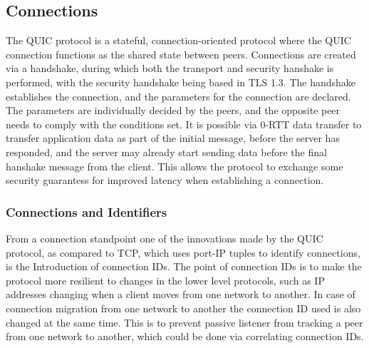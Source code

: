 \documentclass[english, 12pt, a4paper, elec, utf8, a-2b, online]{aaltothesis}
\begin{document}
\subsection{Connections}

The QUIC protocol is a stateful, connection-oriented protocol where the QUIC
connection functions as the shared state between peers. Connections are created
via a handshake, during which both the transport and security hanshake is performed,
with the security handshake being based in TLS 1.3\cite{rfc9001}. The handshake establishes
the connection, and the parameters for the connection are declared. The parameters
are individually decided by the peers, and the opposite peer needs to comply with
the conditions set. It is possible via 0-RTT data transfer to transfer application
data as part of the initial message, before the server has responded, and the server
may already start sending data before the final hanshake message from the client.
This allows the protocol to exchange some security guarantess for improved latency
when establishing a connection\cite{rfc9000}.

\subsubsection{Connections and Identifiers}
\label{sec:connections_ids}

From a connection standpoint one of the innovations made by the QUIC protocol, as
compared to TCP, which uses port-IP tuples to identify connections, is the Introduction
of connection IDs. The point of connection IDs is to make the protocol more resilient
to changes in the lower level protocols, such as IP addresses changing when a client
moves from one network to another. In case of connection migration from one network to
another the connection ID used is also changed at the same time. This is to prevent
passive listener from tracking a peer from one network to another, which could be
done via correlating connection IDs\cite{rfc9000}.
\end{document}
